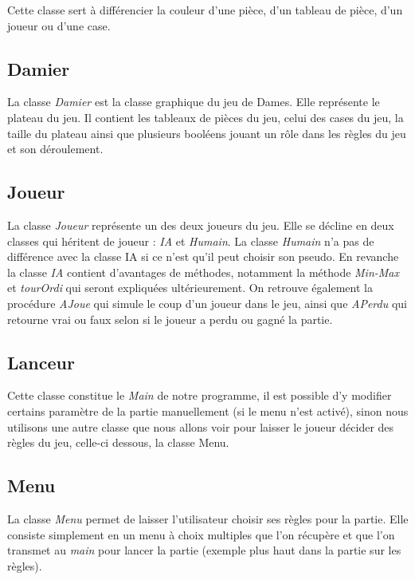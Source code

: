 \documentclass[12,french]{report}
\begin{document}
Cette classe sert à différencier la couleur d'une pièce, d'un tableau de pièce, d'un joueur ou d'une case.

\subsection{Damier}

La classe \textit{Damier} est la classe graphique du jeu de Dames. Elle représente le plateau du jeu. Il contient les tableaux de pièces du jeu, celui des cases du jeu, la taille du plateau ainsi que plusieurs booléens jouant un rôle dans les règles du jeu et son déroulement. %

\subsection{Joueur}

La classe \textit{Joueur} représente un des deux joueurs du jeu. Elle se décline en deux classes qui héritent de joueur : \textit{IA} et \textit{Humain}. La classe \textit{Humain} n'a pas de différence avec la classe IA si ce n'est qu'il peut choisir son pseudo. En revanche la classe \textit{IA} contient d'avantages de méthodes, notamment la méthode \textit{Min-Max} et \textit{tourOrdi} qui seront expliquées ultérieurement. On retrouve également la procédure \textit{AJoue} qui simule le coup d'un joueur dans le jeu, ainsi que \textit{APerdu} qui retourne vrai ou faux selon si le joueur a perdu ou gagné la partie.

\subsection{Lanceur}

Cette classe constitue le \textit{Main} de notre programme, il est possible d'y modifier certains paramètre de la partie manuellement (si le menu n'est activé), sinon nous utilisons une autre classe que nous allons voir pour laisser le joueur décider des règles du jeu, celle-ci dessous, la classe Menu.

\subsection{Menu}

La classe \textit{Menu} permet de laisser l'utilisateur choisir ses règles pour la partie. Elle consiste simplement en un menu à choix multiples que l'on récupère et que l'on transmet au \textit{main} pour lancer la partie (exemple plus haut dans la partie sur les règles).
\end{document}
